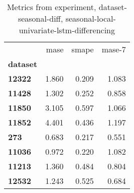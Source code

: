 \begin{table}[h]
\centering
\caption{Metrics from experiment, dataset-seasonal-diff, seasonal-local-univariate-lstm-differencing}
\label{table:seasonal-local-univariate-lstm-differencing-dataset-seasonal-diff}
\begin{tabular}{lrrr}
\toprule
{} &   mase &  smape &  mase-7 \\
\textbf{dataset} &        &        &         \\
\midrule
\textbf{12322  } &  1.860 &  0.209 &   1.083 \\
\textbf{11428  } &  1.302 &  0.252 &   0.858 \\
\textbf{11850  } &  3.105 &  0.597 &   1.066 \\
\textbf{11852  } &  4.401 &  0.436 &   1.197 \\
\textbf{273    } &  0.683 &  0.217 &   0.551 \\
\textbf{11036  } &  0.972 &  0.220 &   1.082 \\
\textbf{11213  } &  1.360 &  0.484 &   0.804 \\
\textbf{12532  } &  1.243 &  0.525 &   0.684 \\
\bottomrule
\end{tabular}
\end{table}
